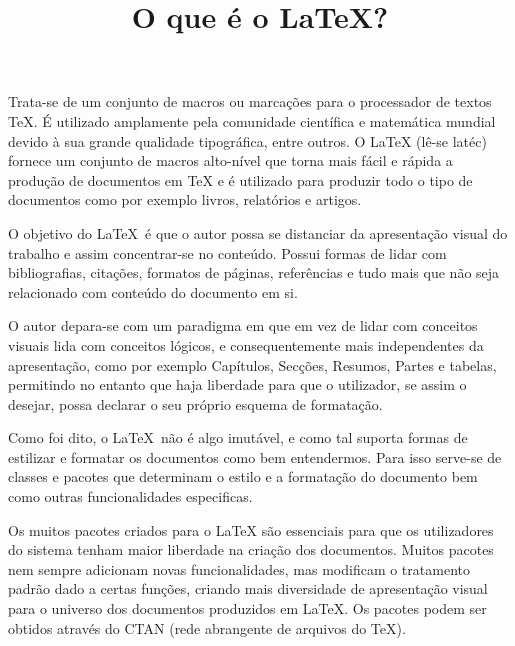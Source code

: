 \documentclass[12pt]{memoir}
\begin{document}
\title {O que é o \LaTeX?}
\date{} %
\maketitle 

Trata-se de um conjunto de macros ou marcações para o processador 
de textos \TeX. 
É utilizado amplamente pela comunidade científica e matemática 
mundial devido à sua grande qualidade tipográfica, entre outros. 
O \LaTeX{} (lê-se latéc) fornece um conjunto de macros alto-nível 
que torna mais fácil e rápida a produção de documentos em \TeX{} 
e é utilizado para produzir todo o tipo de documentos como por 
exemplo livros, relatórios e artigos.

O objetivo do \LaTeX\ é que o autor possa se distanciar 
da apresentação visual do trabalho e assim concentrar-se 
no conteúdo. Possui formas de lidar com bibliografias, citações, 
formatos de páginas, referências e tudo mais que não seja 
relacionado com conteúdo do documento em si.

O autor depara-se com um paradigma em que em vez de lidar 
com conceitos visuais lida com conceitos lógicos, e consequentemente 
mais independentes da apresentação, como por exemplo Capítulos, 
Secções, Resumos, Partes e tabelas, permitindo no entanto que haja 
liberdade para que o utilizador, se assim o desejar, possa declarar 
o seu próprio esquema de formatação.

Como foi dito, o \LaTeX\ não é algo imutável, e como tal suporta 
formas de estilizar e formatar os documentos como bem entendermos. 
Para isso serve-se de classes e pacotes que determinam o estilo e 
a formatação do documento bem como outras funcionalidades especificas.

Os muitos pacotes criados para o LaTeX são essenciais para que 
os utilizadores do sistema tenham maior liberdade na criação dos documentos. 
Muitos pacotes nem sempre adicionam novas funcionalidades, 
mas modificam o tratamento padrão dado a certas funções, 
criando mais diversidade de apresentação visual para o universo 
dos documentos produzidos em LaTeX. 
Os pacotes podem ser obtidos através do CTAN
(rede abrangente de arquivos do \TeX).
\end{document}
